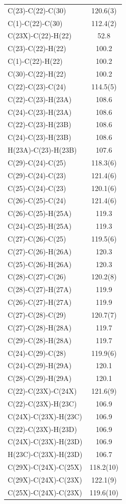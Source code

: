 \begin{center}
{\begin{supertabular}{p{1.5in}c}
C(23)-C(22)-C(30)&120.6(3)\\
C(1)-C(22)-C(30)&112.4(2)\\
C(23X)-C(22)-H(22)&52.8\\
C(23)-C(22)-H(22)&100.2\\
C(1)-C(22)-H(22)&100.2\\
C(30)-C(22)-H(22)&100.2\\
C(22)-C(23)-C(24)&114.5(5)\\
C(22)-C(23)-H(23A)&108.6\\
C(24)-C(23)-H(23A)&108.6\\
C(22)-C(23)-H(23B)&108.6\\
C(24)-C(23)-H(23B)&108.6\\
H(23A)-C(23)-H(23B)&107.6\\
C(29)-C(24)-C(25)&118.3(6)\\
C(29)-C(24)-C(23)&121.4(6)\\
C(25)-C(24)-C(23)&120.1(6)\\
C(26)-C(25)-C(24)&121.4(6)\\
C(26)-C(25)-H(25A)&119.3\\
C(24)-C(25)-H(25A)&119.3\\
C(27)-C(26)-C(25)&119.5(6)\\
C(27)-C(26)-H(26A)&120.3\\
C(25)-C(26)-H(26A)&120.3\\
C(28)-C(27)-C(26)&120.2(8)\\
C(28)-C(27)-H(27A)&119.9\\
C(26)-C(27)-H(27A)&119.9\\
C(27)-C(28)-C(29)&120.7(7)\\
C(27)-C(28)-H(28A)&119.7\\
C(29)-C(28)-H(28A)&119.7\\
C(24)-C(29)-C(28)&119.9(6)\\
C(24)-C(29)-H(29A)&120.1\\
C(28)-C(29)-H(29A)&120.1\\
C(22)-C(23X)-C(24X)&121.6(9)\\
C(22)-C(23X)-H(23C)&106.9\\
C(24X)-C(23X)-H(23C)&106.9\\
C(22)-C(23X)-H(23D)&106.9\\
C(24X)-C(23X)-H(23D)&106.9\\
H(23C)-C(23X)-H(23D)&106.7\\
C(29X)-C(24X)-C(25X)&118.2(10)\\
C(29X)-C(24X)-C(23X)&122.1(9)\\
C(25X)-C(24X)-C(23X)&119.6(10)\\

\end{supertabular}}
\end{center}
